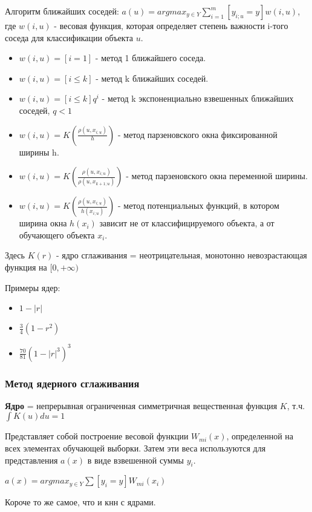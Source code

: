 \documentclass{article}
\begin{document}
Алгоритм ближайших соседей: $a(u) = argmax_{y \in Y} \sum\limits_{i=1}^m
[y_{i;u} = y] w(i, u)$, где $w(i, u)$ - весовая функция, которая определяет
степень важности i-того соседа для классификации объекта $u$.

\begin{itemize}
	\item $w(i, u) = [i = 1]$ - метод 1 ближайшего соседа.
	\item $w(i, u) = [i \leq k]$ - метод k ближайших соседей.
	\item $w(i, u) = [i \leq k]q^i$ - метод k экспоненциально взвешенных ближайших соседей, $q < 1$
	\item $w(i, u) = K\left(\frac{\rho(u, x_{i; u})}{h}\right)$ - метод парзеновского окна фиксированной ширины h.
	\item $w(i, u) = K\left(\frac{\rho(u, x_{i; u})}{\rho(u, x_{k+1; u})}\right)$ -
	метод парзеновского окна переменной ширины.
	\item $w(i, u) = K\left(\frac{\rho(u, x_{i; u})}{h(x_{i; u})}\right)$ -
	метод потенциальных функций, в котором ширина окна $h(x_i)$ зависит не от
	классифицируемого объекта, а от обучающего объекта $x_i$.
\end{itemize}

Здесь $K(r)$ - ядро сглаживания = неотрицательная, монотонно невозрастающая функция на $[0, +\infty)$

Примеры ядер:
\begin{itemize}
	\item $1 - |r|$
	\item $\frac{3}{4}(1 - r^2)$
	\item $\frac{70}{81} (1 - |r|^3)^3$
\end{itemize}

\subsubsection{Метод ядерного сглаживания}

\textbf{Ядро} = непрерывная ограниченная симметричная вещественная функция
$K$, т.ч. $\int K (u) du = 1$

Представляет собой построение весовой функции $W_{mi} (x)$, определенной
на всех элементах обучающей выборки. Затем эти веса используются для
представления $a(x)$ в виде взвешенной суммы $y_i$.

$a(x) = argmax_{y \in Y} \sum [y_i = y] W_{mi} (x_i)$

Короче то же самое, что и кнн с ядрами.
\end{document}
